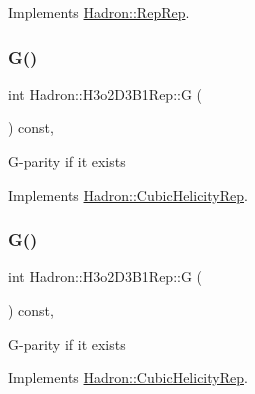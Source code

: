 Implements \mbox{\hyperlink{structHadron_1_1RepRep_a92c8802e5ed7afd7da43ccfd5b7cd92b}{Hadron\+::\+Rep\+Rep}}.

\mbox{\label{structHadron_1_1H3o2D3B1Rep_a24c53ccee9b283bf35da7d7f7a75a88f}} 
\subsubsection{\texorpdfstring{G()}{G()}\hspace{0.1cm}{\footnotesize\ttfamily [1/3]}}
{\footnotesize\ttfamily int Hadron\+::\+H3o2\+D3\+B1\+Rep\+::G (\begin{DoxyParamCaption}{ }\end{DoxyParamCaption}) const\hspace{0.3cm}{\ttfamily [inline]}, {\ttfamily [virtual]}}

G-\/parity if it exists 

Implements \mbox{\hyperlink{structHadron_1_1CubicHelicityRep_a50689f42be1e6170aa8cf6ad0597018b}{Hadron\+::\+Cubic\+Helicity\+Rep}}.

\mbox{\label{structHadron_1_1H3o2D3B1Rep_a24c53ccee9b283bf35da7d7f7a75a88f}} 
\subsubsection{\texorpdfstring{G()}{G()}\hspace{0.1cm}{\footnotesize\ttfamily [2/3]}}
{\footnotesize\ttfamily int Hadron\+::\+H3o2\+D3\+B1\+Rep\+::G (\begin{DoxyParamCaption}{ }\end{DoxyParamCaption}) const\hspace{0.3cm}{\ttfamily [inline]}, {\ttfamily [virtual]}}

G-\/parity if it exists 

Implements \mbox{\hyperlink{structHadron_1_1CubicHelicityRep_a50689f42be1e6170aa8cf6ad0597018b}{Hadron\+::\+Cubic\+Helicity\+Rep}}.

\mbox{\label{structHadron_1_1H3o2D3B1Rep_a24c53ccee9b283bf35da7d7f7a75a88f}} 
